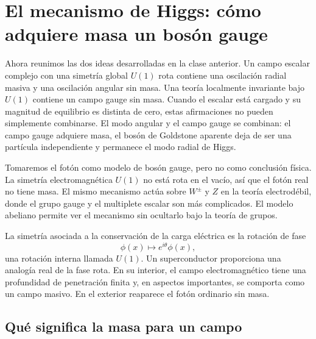 \chapter{El mecanismo de Higgs: cómo adquiere masa un bosón gauge}

Ahora reunimos las dos ideas desarrolladas en la clase anterior. Un campo escalar complejo con una simetría global \(U(1)\) rota contiene una oscilación radial masiva y una oscilación angular sin masa. Una teoría localmente invariante bajo \(U(1)\) contiene un campo gauge sin masa. Cuando el escalar está cargado y su magnitud de equilibrio es distinta de cero, estas afirmaciones no pueden simplemente combinarse. El modo angular y el campo gauge se combinan: el campo gauge adquiere masa, el bosón de Goldstone aparente deja de ser una partícula independiente y permanece el modo radial de Higgs.

Tomaremos el fotón como modelo de bosón gauge, pero no como conclusión física. La simetría electromagnética \(U(1)\) no está rota en el vacío, así que el fotón real no tiene masa. El mismo mecanismo actúa sobre \(W^\pm\) y \(Z\) en la teoría electrodébil, donde el grupo gauge y el multiplete escalar son más complicados. El modelo abeliano permite ver el mecanismo sin ocultarlo bajo la teoría de grupos.

\begin{classroomqa}
\end{classroomqa}

La simetría asociada a la conservación de la carga eléctrica es la rotación de fase
\begin{equation}
  \phi(x)\longmapsto e^{i\theta}\phi(x),
\end{equation}
una rotación interna llamada \(U(1)\). Un superconductor proporciona una analogía real de la fase rota. En su interior, el campo electromagnético tiene una profundidad de penetración finita y, en aspectos importantes, se comporta como un campo masivo. En el exterior reaparece el fotón ordinario sin masa.

\section{Qué significa la masa para un campo}

